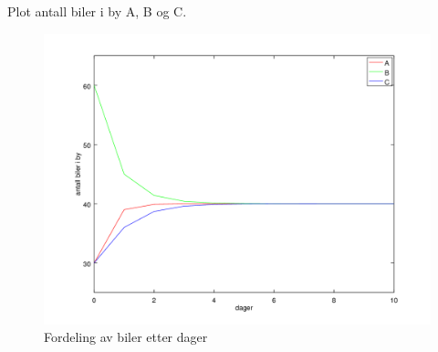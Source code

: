 Plot antall biler i by A, B og C.

\begin{figure}[H]
  \centering
  \includegraphics[width=\textwidth]{oppg1e}
  \caption{Fordeling av biler etter dager}
\end{figure}


